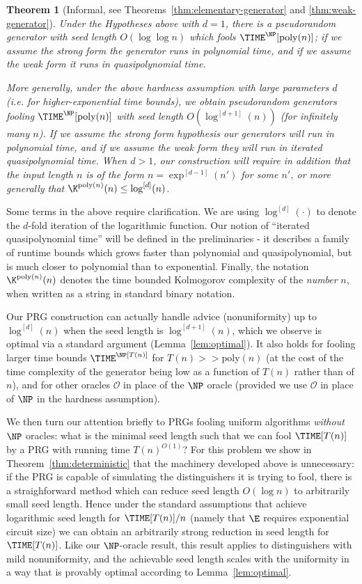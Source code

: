 \documentclass[11pt]{article}
\newtheorem{theorem}{Theorem}
\renewcommand{\poly}{\mathrm{poly}}
\begin{document}
\begin{theorem}[Informal, see Theorems~\ref{thm:elementary-generator} and \ref{thm:weak-generator}]
\label{thm:mainthm1}
Under the Hypotheses above with $d=1$, there is a pseudorandom generator with seed length $O(\log \log n)$ which fools $\TIME^{\NP}[\poly(n)]$; if we assume the strong form the generator runs in polynomial time, and if we assume the weak form it runs in quasipolynomial time.

More generally, under the above hardness assumption with large parameters $d$ (i.e. for higher-exponential time bounds), we obtain pseudorandom generators fooling $\TIME^{\NP}[\poly(n)]$ with seed length $O(\log^{[d+1]}(n))$ (for infinitely many $n$). If we assume the strong form hypothesis our generators will run in polynomial time, and if we assume the weak form they will run in iterated quasipolynomial time. When $d > 1$, our construction will require in addition that the input length $n$ is of the form $n = \exp^{[d-1]}(n')$ for some $n'$, or more generally that $\K^{\poly(n)}(n) \leq \log^{[d]}(n)$.
\end{theorem}

Some terms in the above require clarification. We are using $ \log^{[d]}(\cdot)$ to denote the $d$-fold iteration of the logarithmic function. 
Our notion of ``iterated quasipolynomial time'' will be defined in the preliminaries - it describes a family of runtime bounds which grows faster than polynomial and quasipolynomial, but is much closer to polynomial than to exponential. Finally, the notation $\K^{\poly(n)}(n)$ denotes the time bounded Kolmogorov complexity of the \emph{number} $n$, when written as a string in standard binary notation.

Our PRG construction can actually handle advice (nonuniformity) up to $\log^{[d]}(n)$ when the seed length is $\log^{[d+1]}(n)$, which we observe is optimal via a standard argument (Lemma~\ref{lem:optimal}). It also holds for fooling larger time bounds $\TIME^\NP[T(n)]$ for $T(n)>> \poly(n)$ (at the cost of the time complexity of the generator being low as a function of $T(n)$ rather than of $n$), and for other oracles $\mathcal{O}$ in place of the $\NP$ oracle (provided we use $\mathcal{O}$ in place of $\NP$ in the hardness assumption).

We then turn our attention briefly to PRGs fooling uniform algorithms \emph{without} $\NP$ oracles: what is the minimal seed length such that we can fool $\TIME[T(n)]$ by a PRG with running time $T(n)^{O(1)}$? For this problem we show in Theorem~\ref{thm:deterministic} that the machinery developed above is unnecessary: if the PRG is capable of simulating the distinguishers it is trying to fool, there is a straighforward method which can reduce seed length $O(\log n)$ to arbitrarily small seed length. Hence under the standard assumptions that achieve logarithmic seed length for $\TIME[T(n)]/n$ (namely that $\E$ requires exponential circuit size) we can obtain an arbitrarily strong reduction in seed length for $\TIME[T(n)]$. Like our $\NP$-oracle result, this result applies to distinguishers with mild nonuniformity, and the achievable seed length scales with the uniformity in a way that is provably optimal according to Lemma~\ref{lem:optimal}.
\end{document}
